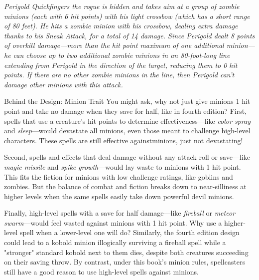 \documentclass[10pt,a4paper,twoside,bg=print,twocolumn,openany,nodeprecatedcode]{dndbook}
\begin{document}
\textit{Perigold Quickfingers the rogue is hidden and takes aim at a group of zombie minions (each with 6 hit points) with his light crossbow (which has a short range of 80 feet). He hits a zombie minion with his crossbow, dealing extra damage thanks to his Sneak Attack, for a total of 14 damage. Since Perigold dealt 8 points of overkill damage—more than the hit point maximum of one additional minion—he can choose up to two additional zombie minions in an 80-foot-long line extending from Perigold in the direction of the target, reducing them to 0 hit points. If there are no other zombie minions in the line, then Perigold can't damage other minions with this attack.}

\begin{DndSidebar}[float=!b]{Behind the Design: Minion Trait}
You might ask, why not just give minions 1 hit point and take no damage when they save for half, like in fourth edition? First, spells that use a creature's hit points to determine effectiveness—like \textit{color spray} and \textit{sleep}—would devastate all minions, even those meant to challenge high-level characters. These spells are still effective againstminions, just not devastating!



Second, spells and effects that deal damage without any attack roll or save—like \textit{magic missile} and \textit{spike growth}—would lay waste to minions with 1 hit point. This fits the fiction for minions with low challenge ratings, like goblins and zombies. But the balance of combat and fiction breaks down to near-silliness at higher levels when the same spells easily take down powerful devil minions.



Finally, high-level spells with a save for half damage—like \textit{fireball} or \textit{meteor swarm}—would feel wasted against minions with 1 hit point. Why use a higher-level spell when a lower-level one will do? Similarly, the fourth edition design could lead to a kobold minion illogically surviving a fireball spell while a "stronger" standard kobold next to them dies, despite both creatures succeeding on their saving throw. By contrast, under this book's minion rules, spellcasters still have a good reason to use high-level spells against minions.



\end{DndSidebar}
\end{document}
